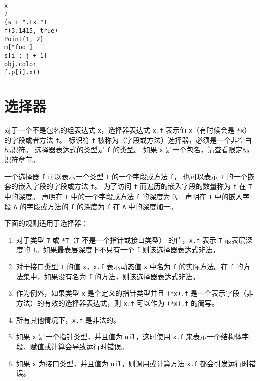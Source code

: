 \begin{lstlisting}[style=golang]
x
2
(s + ".txt")
f(3.1415, true)
Point{1, 2}
m["foo"]
s[i : j + 1]
obj.color
f.p[i].x()
\end{lstlisting}

\section{选择器}
对于一个不是包名的组表达式 \lstinline|x|，选择器表达式 \lstinline|x.f| 表示值 \lstinline|x|（有时候会是 \lstinline|*x|） 的字段或者方法 \lstinline|f|。
标识符 \lstinline|f| 被称为（字段或方法）选择器，必须是一个非空白标识符。
选择器表达式的类型是 \lstinline|f| 的类型。
如果 \lstinline|x| 是一个包名，请查看限定标识符章节。

一个选择器 \lstinline|f| 可以表示一个类型 \lstinline|T| 的一个字段或方法 \lstinline|f|，
也可以表示 \lstinline|T| 的一个嵌套的嵌入字段的字段或方法 \lstinline|f|。
为了访问 \lstinline|f| 而遍历的嵌入字段的数量称为 \lstinline|f| 在 \lstinline|T| 中的深度。
声明在 \lstinline|T| 中的一个字段或方法 \lstinline|f| 的深度为 0。
声明在 \lstinline|T| 中的嵌入字段 \lstinline|A| 的字段或方法的 \lstinline|f| 的深度为 \lstinline|f| 在 \lstinline|A| 中的深度加一。

下面的规则适用于选择器：
\begin{enumerate}
\item
对于类型 \lstinline|T| 或 \lstinline|*T|（\lstinline|T| 不是一个指针或接口类型） 的值，\lstinline|x.f| 表示 \lstinline|T| 最表层深度的 \lstinline|T|。如果最表层深度下不只有一个 \lstinline|f| 则该选择器表达式非法。
\item 
对于接口类型 \lstinline|I| 的值 \lstinline|x|，\lstinline|x.f| 表示动态值 \lstinline|x| 中名为 \lstinline|f| 的实际方法。在 \lstinline|f| 的方法集中，如果没有名为 \lstinline|f| 的方法，则该选择器表达式非法。
\item
作为例外，如果类型 \lstinline|x| 是个定义的指针类型并且 \lstinline|(*x).f| 是一个表示字段（非方法）的有效的选择器表达式，则 \lstinline|x.f| 可以作为 \lstinline|(*x).f| 的简写。
\item
所有其他情况下，\lstinline|x.f| 是非法的。
\item 
如果 \lstinline|x| 是一个指针类型，并且值为 \lstinline|nil|，这时使用 \lstinline|x.f| 来表示一个结构体字段、赋值或计算会导致运行时错误。
\item 
如果 \lstinline|x| 为接口类型，并且值为 \lstinline|nil|，则调用或计算方法 \lstinline|x.f| 都会引发运行时错误。
\end{enumerate}

